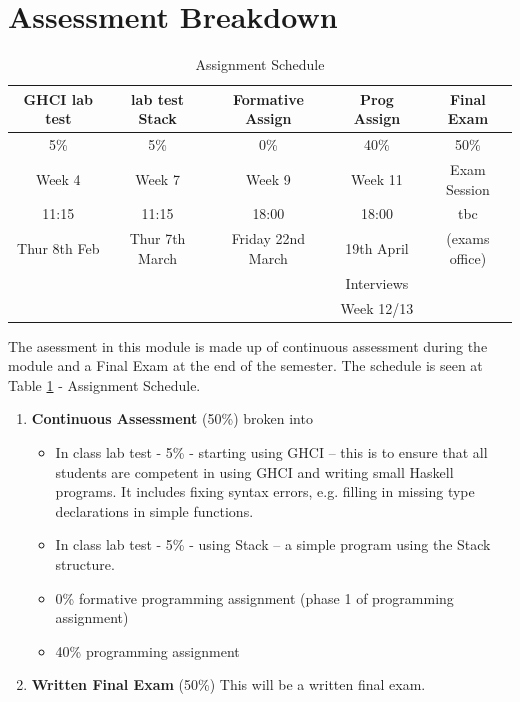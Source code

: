 \documentclass{article}
\begin{document}
\section{Assessment Breakdown} 
\begin{table}
\begin{center}
    \begin{tabular}{|  c | c | c | c |  c |}
        \hline
        \rowcolor{green!50}
        GHCI lab test  & lab test Stack & Formative Assign & Prog Assign & Final Exam \\  
    
    \hline
    \rowcolor{green!20!yellow!40}
    5\% & 5\% & 0\% & 40\% & 50\% \\ 
    \rowcolor{red!60}
    Week 4 & Week 7 & Week 9 & Week 11 & Exam Session \\ 
     \hline
     \rowcolor{red!60}
    11:15 & 11:15 & 18:00 & 18:00 & tbc  \\ 
    
     \rowcolor{red!60}
    Thur 8th Feb & Thur 7th March & Friday 22nd March & 19th  April & (exams office) \\ 
     \hline
    
     \hline
     \rowcolor{blue!40}
    
     & & &Interviews &\\ 
     \rowcolor{blue!40}
     & &  &Week 12/13  &\\ 


     \hline
  
    \end{tabular}
    \caption{Assignment Schedule}
    \label{tab:ass-schedule}   
    
\end{center}
\end{table}
The asessment in this module is made up of continuous assessment during the module and a Final Exam at the end of the semester. 
The schedule is seen at Table \ref{tab:ass-schedule} - Assignment Schedule. 
\begin{enumerate}

    \item  \textbf{Continuous Assessment} (50\%) broken into 
    \begin{itemize}
        \item In class lab test - 5\% - starting using GHCI – this is to ensure that all students are competent in using GHCI and writing small Haskell programs. It includes fixing syntax errors, e.g. filling in missing type declarations in simple functions.
        \item In class lab test - 5\% - using Stack – a simple program using the Stack structure.
        \item  0\% formative programming assignment (phase 1 of programming assignment)
        \item  40\% programming assignment 
    \end{itemize}
    \item \textbf{Written Final Exam} (50\%) This will be a written final exam. 
\end{enumerate}
\end{document}
